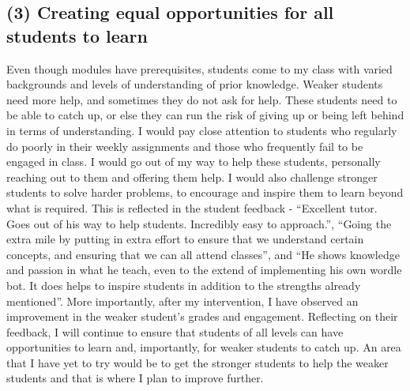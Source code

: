 \documentclass[11pt, a4paper]{article}
\begin{document}
\subsection{(3) Creating equal opportunities for all students to learn}
Even though modules have prerequisites, students come to my class with varied backgrounds and levels of understanding of prior knowledge. Weaker students need more help, and sometimes they do not ask for help. These students need to be able to catch up, or else they can run the risk of giving up or being left behind in terms of understanding. I would pay close attention to students who regularly do poorly in their weekly assignments and those who frequently fail to be engaged in class. I would go out of my way to help these students, personally reaching out to them and offering them help. I would also challenge stronger students to solve harder problems, to encourage and inspire them to learn beyond what is required. This is reflected in the student feedback - “Excellent tutor. Goes out of his way to help students. Incredibly easy to approach.”, “Going the extra mile by putting in extra effort to ensure that we understand certain concepts, and ensuring that we can all attend classes”, and “He shows knowledge and passion in what he teach, even to the extend of implementing his own wordle bot. It does helps to inspire students in addition to the strengths already mentioned”. More importantly, after my intervention, I have observed an improvement in the weaker student's grades and engagement. Reflecting on their feedback, I will continue to ensure that students of all levels can have opportunities to learn and, importantly, for weaker students to catch up. An area that I have yet to try would be to get the stronger students to help the weaker students and that is where I plan to improve further.
\end{document}
